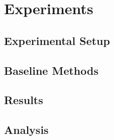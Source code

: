 \documentclass[../main.tex]{subfiles}
\begin{document}
\chapter{Experiments}
\label{sec:experiment}


\section{Experimental Setup}

\section{Baseline Methods}

\section{Results}





\section{Analysis}
\end{document}
